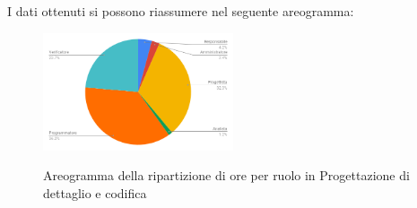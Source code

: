 I dati ottenuti si possono riassumere nel seguente areogramma:
\begin{figure}[H] 
			\centering 
				\includegraphics[width=0.5\textwidth]{res/images/areogramma_dettaglio.png}\\
				\caption{Areogramma della ripartizione di ore per ruolo in Progettazione di dettaglio e codifica}
			\label{AreogrammaDettaglio}
\end{figure}


